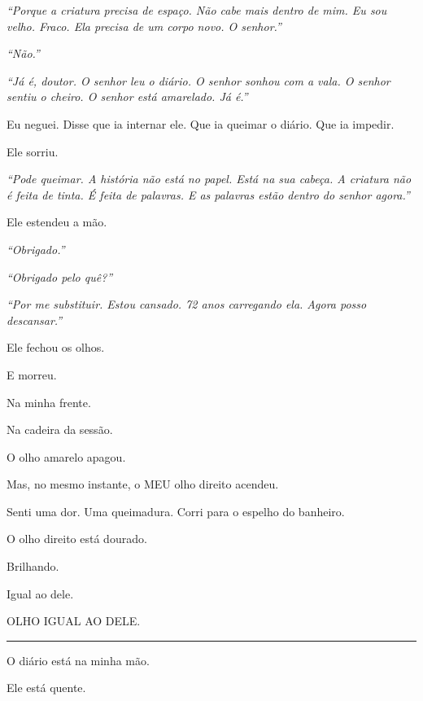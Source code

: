 \noindent \textit{\textquotedblleft{}Porque a criatura precisa de espaço. Não cabe mais dentro de mim. Eu sou velho. Fraco. Ela precisa de um corpo novo. O senhor.\textquotedblright{}}

\noindent \textit{\textquotedblleft{}Não.\textquotedblright{}}

\noindent \textit{\textquotedblleft{}Já é, doutor. O senhor leu o diário. O senhor sonhou com a vala. O senhor sentiu o cheiro. O senhor está amarelado. Já é.\textquotedblright{}}

\noindent Eu neguei. Disse que ia internar ele. Que ia queimar o diário. Que ia impedir.

\noindent Ele sorriu.

\noindent \textit{\textquotedblleft{}Pode queimar. A história não está no papel. Está na sua cabeça. A criatura não é feita de tinta. É feita de palavras. E as palavras estão dentro do senhor agora.\textquotedblright{}}

\noindent Ele estendeu a mão.

\noindent \textit{\textquotedblleft{}Obrigado.\textquotedblright{}}

\noindent \textit{\textquotedblleft{}Obrigado pelo quê?\textquotedblright{}}

\noindent \textit{\textquotedblleft{}Por me substituir. Estou cansado. 72 anos carregando ela. Agora posso descansar.\textquotedblright{}}

\noindent Ele fechou os olhos.

\noindent E morreu.

\noindent Na minha frente.

\noindent Na cadeira da sessão.

\noindent O olho amarelo apagou.

\noindent Mas, no mesmo instante, o MEU olho direito acendeu.

\noindent Senti uma dor. Uma queimadura. Corri para o espelho do banheiro.

\noindent O olho direito está dourado.

\noindent Brilhando.

\noindent Igual ao dele.

\noindent OLHO IGUAL AO DELE.

\vspace{0.5em}\noindent\rule{\textwidth}{0.5pt}\vspace{0.5em}

\noindent O diário está na minha mão.

\noindent Ele está quente.

